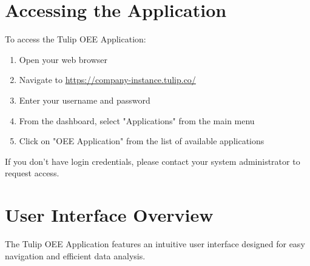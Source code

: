 \documentclass[12pt,a4paper]{report}
\newenvironment{note}
  {\begin{tcolorbox}[colback=tuliplightgray,colframe=tulipblue,title=Note]}
  {\end{tcolorbox}}
\begin{document}
\section{Accessing the Application}

To access the Tulip OEE Application:

\begin{enumerate}
    \item Open your web browser
    \item Navigate to \url{https://company-instance.tulip.co/}
    \item Enter your username and password
    \item From the dashboard, select "Applications" from the main menu
    \item Click on "OEE Application" from the list of available applications
\end{enumerate}

\begin{note}
If you don't have login credentials, please contact your system administrator to request access.
\end{note}

\section{User Interface Overview}

The Tulip OEE Application features an intuitive user interface designed for easy navigation and efficient data analysis.
\end{document}
